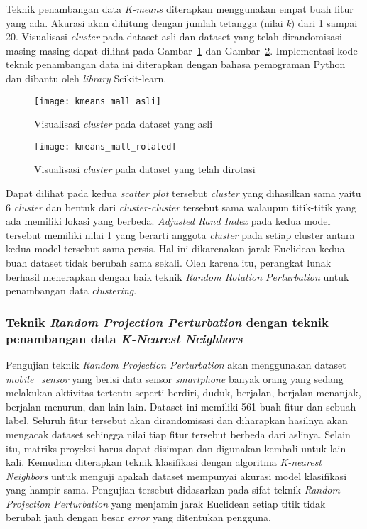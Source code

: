 Teknik penambangan data \textit{K-means} diterapkan menggunakan empat buah fitur yang ada. Akurasi akan dihitung dengan jumlah tetangga (nilai \textit{k}) dari 1 sampai 20. Visualisasi \textit{cluster} pada dataset asli dan dataset yang telah dirandomisasi masing-masing dapat dilihat pada Gambar~\ref{fig:kmeans_mall_asli} dan Gambar~\ref{fig:kmeans_mall_rotated}. Implementasi kode teknik penambangan data ini diterapkan dengan bahasa pemograman Python dan dibantu oleh \textit{library} Scikit-learn. 

\begin{figure}
	\centering
	\texttt{[image: kmeans\_mall\_asli]}
	\caption{Visualisasi \textit{cluster} pada dataset yang asli}
	\label{fig:kmeans_mall_asli}
\end{figure}

\begin{figure}
	\centering
	\texttt{[image: kmeans\_mall\_rotated]}
	\caption{Visualisasi \textit{cluster} pada dataset yang telah dirotasi}
	\label{fig:kmeans_mall_rotated}
\end{figure}

Dapat dilihat pada kedua \textit{scatter plot} tersebut \textit{cluster} yang dihasilkan sama yaitu 6 \textit{cluster} dan bentuk dari \textit{cluster-cluster} tersebut sama walaupun titik-titik yang ada memiliki lokasi yang berbeda. \textit{Adjusted Rand Index} pada kedua model tersebut memiliki nilai 1 yang berarti anggota \textit{cluster} pada setiap cluster antara kedua model tersebut sama persis. Hal ini dikarenakan jarak Euclidean kedua buah dataset tidak berubah sama sekali. Oleh karena itu, perangkat lunak berhasil menerapkan dengan baik teknik \textit{Random Rotation Perturbation} untuk penambangan data \textit{clustering}.

\subsubsection{Teknik \textit{Random Projection Perturbation} dengan teknik penambangan data \textit{K-Nearest Neighbors}}
\label{sec:rpp-knn}

Pengujian teknik \textit{Random Projection Perturbation} akan menggunakan dataset \textit{mobile\_sensor} yang berisi data sensor \textit{smartphone} banyak orang yang sedang melakukan aktivitas tertentu seperti berdiri, duduk, berjalan, berjalan menanjak, berjalan menurun, dan lain-lain. Dataset ini memiliki 561 buah fitur dan sebuah label. Seluruh fitur tersebut akan dirandomisasi dan diharapkan hasilnya akan mengacak dataset sehingga nilai tiap fitur tersebut berbeda dari aslinya. Selain itu, matriks proyeksi harus dapat disimpan dan digunakan kembali untuk lain kali. Kemudian diterapkan teknik klasifikasi dengan algoritma \textit{K-nearest Neighbors} untuk menguji apakah dataset mempunyai akurasi model klasifikasi yang hampir sama. Pengujian tersebut didasarkan pada sifat teknik \textit{Random Projection Perturbation} yang menjamin jarak Euclidean setiap titik tidak berubah jauh dengan besar \textit{error} yang ditentukan pengguna.

